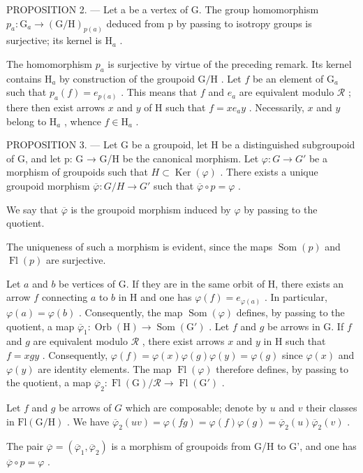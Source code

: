 PROPOSITION 2. --- Let a be a vertex of G. The group homomorphism \(p_{a}\colon\mathrm{G}_{a}\to(\mathrm{G}/\mathrm{H})_{p(a)}\) deduced from p by passing to isotropy groups is surjective; its kernel is \(\mathrm{H}_{a}\) .

The homomorphism \(p_a\) is surjective by virtue of the preceding remark. Its kernel contains \(\mathrm{H}_a\) by construction of the groupoid \(\mathrm{G / H}\) . Let \(f\) be an element of \(\mathrm{G}_a\) such that \(p_a(f) = e_{p(a)}\) . This means that \(f\) and \(e_a\) are equivalent modulo \(\mathcal{R}\) ; there then exist arrows \(x\) and \(y\) of H such that \(f = xe_a y\) . Necessarily, \(x\) and \(y\) belong to \(\mathrm{H}_a\) , whence \(f \in \mathrm{H}_a\) .

PROPOSITION 3. --- Let G be a groupoid, let H be a distinguished subgroupoid of G, and let p: G → G/H be the canonical morphism. Let \(\varphi\colon G\to G'\) be a morphism of groupoids such that \(H\subset\operatorname{Ker}(\varphi)\) . There exists a unique groupoid morphism \(\overline{\varphi}\colon G/H\to G'\) such that \(\overline{\varphi}\circ p=\varphi\) .

We say that \(\overline{\varphi}\) is the groupoid morphism induced by \(\varphi\) by passing to the quotient.

The uniqueness of such a morphism is evident, since the maps \(\operatorname{Som}(p)\) and \(\operatorname{Fl}(p)\) are surjective.

Let \(a\) and \(b\) be vertices of G. If they are in the same orbit of H, there exists an arrow \(f\) connecting \(a\) to \(b\) in H and one has \(\varphi(f) = e_{\varphi(a)}\) . In particular, \(\varphi(a) = \varphi(b)\) . Consequently, the map \(\operatorname{Som}(\varphi)\) defines, by passing to the quotient, a map \(\overline{\varphi}_1\colon \operatorname{Orb}(\mathrm{H}) \to \operatorname{Som}(\mathrm{G}')\) . Let \(f\) and \(g\) be arrows in G. If \(f\) and \(g\) are equivalent modulo \(\mathcal{R}\) , there exist arrows \(x\) and \(y\) in H such that \(f = xgy\) . Consequently, \(\varphi(f) = \varphi(x)\varphi(g)\varphi(y) = \varphi(g)\) since \(\varphi(x)\) and \(\varphi(y)\) are identity elements. The map \(\operatorname{Fl}(\varphi)\) therefore defines, by passing to the quotient, a map \(\overline{\varphi}_2\colon \operatorname{Fl}(\mathrm{G}) / \mathcal{R} \to \operatorname{Fl}(\mathrm{G}')\) .

Let \(f\) and \(g\) be arrows of \(G\) which are composable; denote by \(u\) and \(v\) their classes in \(\mathrm{Fl}(\mathrm{G} / \mathrm{H})\) . We have \(\overline{\varphi}_2(uv) = \varphi(fg) = \varphi(f)\varphi(g) = \overline{\varphi}_2(u)\overline{\varphi}_2(v)\) .

The pair \(\overline{\varphi} = (\overline{\varphi}_1, \overline{\varphi}_2)\) is a morphism of groupoids from G/H to G', and one has \(\overline{\varphi} \circ p = \varphi\) .

